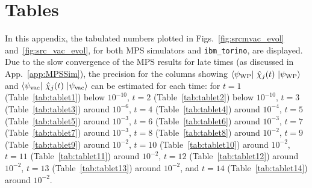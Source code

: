 \documentclass[aps, prc, tightenlines,superscriptaddress, letterpaper, amsmath, amssymb, preprintnumbers, floatfix, longbibliography, nofootinbib]{revtex4-2}
\begin{document}
\section{Tables}
\label{app:tables}
\noindent
In this appendix, the tabulated numbers plotted in Figs.~\ref{fig:srcmvac_evol} and~\ref{fig:src_vac_evol}, for both MPS simulators and {\tt ibm\_torino}, are displayed. Due to the slow convergence of the MPS results for late times (as discussed in App.~\ref{app:MPSSim}), the precision for the columns showing $\langle \psi_{\rm WP}\vert \ \hat{\chi}_j(t) \  \vert \psi_{\rm WP} \rangle$ and $\langle \psi_{\rm vac}\vert \ \hat{\chi}_j(t) \  \vert \psi_{\rm vac} \rangle$ can be estimated for each time: for $t=1$ (Table~\ref{tab:tablet1}) below $10^{-10}$, $t=2$ (Table~\ref{tab:tablet2}) below $10^{-10}$, $t=3$ (Table~\ref{tab:tablet3}) around $10^{-6}$, $t=4$ (Table~\ref{tab:tablet4}) around $10^{-4}$, $t=5$ (Table~\ref{tab:tablet5}) around $10^{-3}$, $t=6$ (Table~\ref{tab:tablet6}) around $10^{-3}$, $t=7$ (Table~\ref{tab:tablet7}) around $10^{-3}$, $t=8$ (Table~\ref{tab:tablet8}) around $10^{-2}$, $t=9$ (Table~\ref{tab:tablet9}) around $10^{-2}$, $t=10$ (Table~\ref{tab:tablet10}) around $10^{-2}$, $t=11$ (Table~\ref{tab:tablet11}) around $10^{-2}$, $t=12$ (Table~\ref{tab:tablet12}) around $10^{-2}$, $t=13$ (Table~\ref{tab:tablet13}) around $10^{-2}$, and $t=14$ (Table~\ref{tab:tablet14}) around $10^{-2}$.
%
\end{document}
